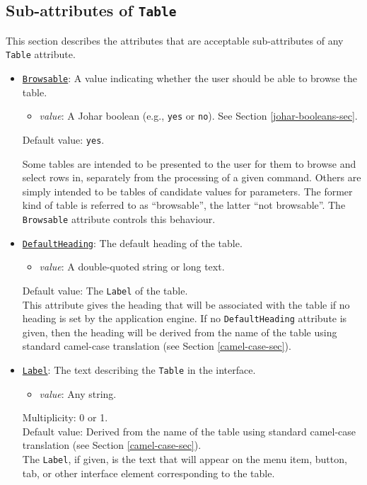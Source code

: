 \documentclass[11pt]{article}
\begin{document}

\subsection{Sub-attributes of {\tt Table}}
\label{sub-attr-table-sec}

This section describes the attributes that are acceptable
sub-attributes of any {\tt Table} attribute.

\begin{itemize}

\item \underline{\tt Browsable}:  A value indicating whether
the user should be able to browse the table.
\begin{itemize}
\item {\it value}: A Johar boolean (e.g., \verb/yes/ or \verb/no/).
  See Section \ref{johar-booleans-sec}.
\end{itemize}
Default value: {\tt yes}.

Some tables are intended to be presented to the user for them
to browse and select rows in, separately from the processing
of a given command.  Others are simply intended to be
tables of candidate values for parameters.  The former kind of
table is referred to as ``browsable'', the latter
``not browsable''.  The {\tt Browsable} attribute controls this
behaviour.

\item \underline{\tt DefaultHeading}:  The default heading of the
table.
\begin{itemize}
\item {\it value}: A double-quoted string or long text.
\end{itemize}
Default value: The {\tt Label} of the table. \\
This attribute gives the heading that will be associated with
the table if no heading is set by the application engine.
If no {\tt DefaultHeading} attribute is given, then the heading will be
derived from the name of the table using standard camel-case
translation (see Section \ref{camel-case-sec}).

\item \underline{\tt Label}:  The text describing the {\tt Table}
in the interface.
\begin{itemize}
\item {\it value}: Any string.
\end{itemize}
Multiplicity: 0 or 1. \\
Default value: Derived from the name of the table using standard
camel-case translation (see Section \ref{camel-case-sec}). \\
The {\tt Label}, if given, is the text that will appear on the menu item,
button, tab, or other interface element corresponding to the table.


\end{itemize}
\end{document}
